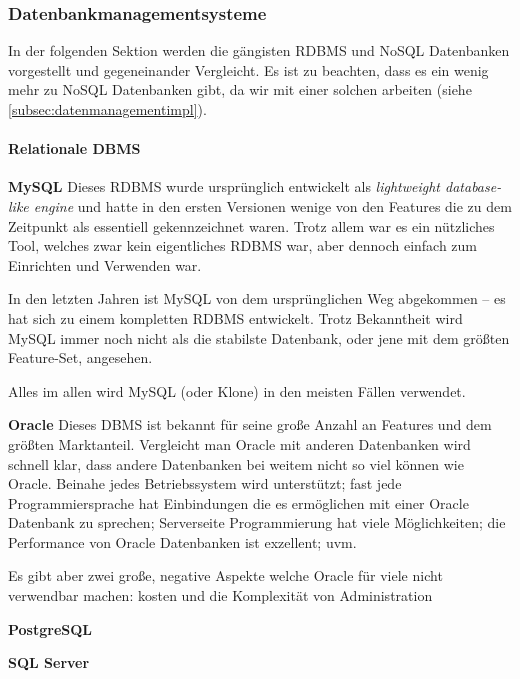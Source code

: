 \subsubsection{Datenbankmanagementsysteme}
\label{subsec:dbms}

In der folgenden Sektion werden die gängisten RDBMS und NoSQL Datenbanken vorgestellt und gegeneinander Vergleicht. Es ist zu beachten, dass es ein wenig mehr zu NoSQL Datenbanken gibt, da wir mit einer solchen arbeiten (siehe \ref{subsec:datenmanagementimpl}).

\paragraph{Relationale DBMS\nextline}
\tab\textbf{MySQL\newline}
Dieses RDBMS wurde ursprünglich entwickelt als \textit{lightweight database-like engine} und hatte in den ersten Versionen wenige von den Features die zu dem Zeitpunkt als essentiell gekennzeichnet waren. Trotz allem war es ein nützliches Tool, welches zwar kein eigentliches RDBMS war, aber dennoch einfach zum Einrichten und Verwenden war.

In den letzten Jahren ist MySQL von dem ursprünglichen Weg abgekommen – es hat sich zu einem kompletten RDBMS entwickelt.  Trotz Bekanntheit wird MySQL immer noch nicht als die stabilste Datenbank, oder jene mit dem größten Feature-Set, angesehen.

Alles im allen wird MySQL (oder Klone) in den meisten Fällen verwendet.

\tab\textbf{Oracle\newline}
Dieses DBMS ist bekannt für seine große Anzahl an Features und dem größten Marktanteil. Vergleicht man Oracle mit anderen Datenbanken wird schnell klar, dass andere Datenbanken bei weitem nicht so viel können wie Oracle. Beinahe jedes Betriebssystem wird unterstützt; fast jede Programmiersprache hat Einbindungen die es ermöglichen mit einer Oracle Datenbank zu sprechen; Serverseite Programmierung hat viele Möglichkeiten; die Performance von Oracle Datenbanken ist exzellent; uvm.

Es gibt aber zwei große, negative Aspekte welche Oracle für viele nicht verwendbar machen: kosten und die Komplexität von Administration

\tab\textbf{PostgreSQL\newline}

\tab\textbf{SQL Server\newline}

